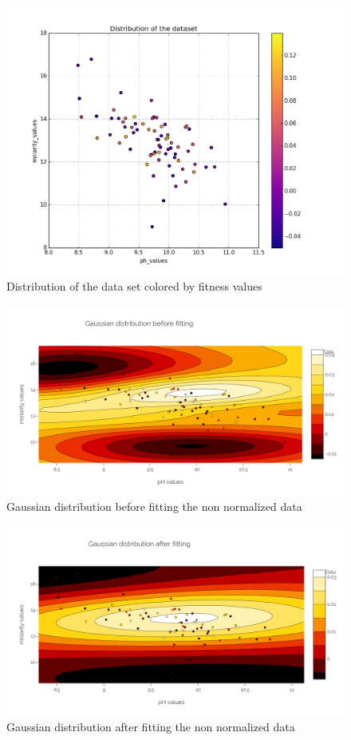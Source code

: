 \documentclass[a4paper]{article}
\begin{document}
\begin{figure}
	\centering
	\includegraphics[width=1\textwidth]{train_data_set_scatter.png}
	\caption{Distribution of the data set colored by fitness values}
	\label{fig:distributuion_data_set}
\end{figure}

\begin{figure}
\centering
\includegraphics[width=1\textwidth]{before_fit_non_norm.png}
\caption{Gaussian distribution before fitting the  non normalized data}
\label{fig:before_fit_non_norm}
\end{figure}

\begin{figure}
	\centering
	\includegraphics[width=1\textwidth]{after_fit_non_norm.png}
	\caption{Gaussian distribution after fitting the  non normalized data}
	\label{fig:after_fit_non_norm}
\end{figure}
\newpage
\end{document}
